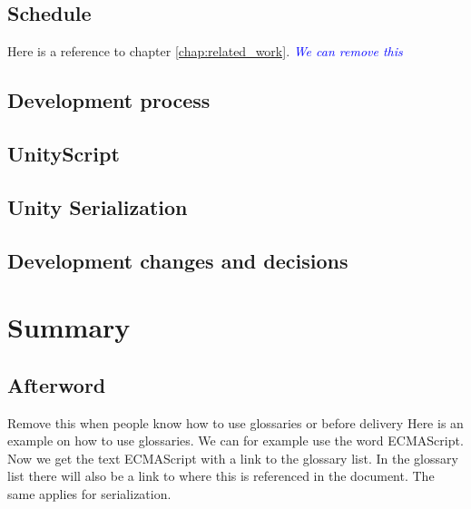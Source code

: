 \documentclass[BSP,english,oneside]{classes/gucthesis}
\newcommand{\comment}[1]{\textcolor{blue}{\emph{#1}}}
\newcommand{\todo}[1]{{\color{green}#1}}
\begin{document}
	\chapter{Schedule}
		
		Here is a reference to chapter \ref{chap:related_work}. \comment{We can remove this}

	\chapter{Development process}
		

	\chapter{UnityScript}
		\label{chap:UnityScript}
		

	\chapter{Unity Serialization}
		\label{chap:UnitySerialization}
		

	\chapter{Development changes and decisions}
		\label{chap:Developmentchangesanddecisions}
		


\part{Summary}

	\chapter{Afterword}
		\label{chap:afterword}
		


\todo{Remove this when people know how to use glossaries or before delivery}
Here is an example on how to use glossaries. We can for example use the word
\gls{ECMAScript}. Now we get the text ECMAScript with a link to the glossary
list. In the glossary list there will also be a link to where this is 
referenced in the document. The same applies for \gls{serialization}.





\end{document}
